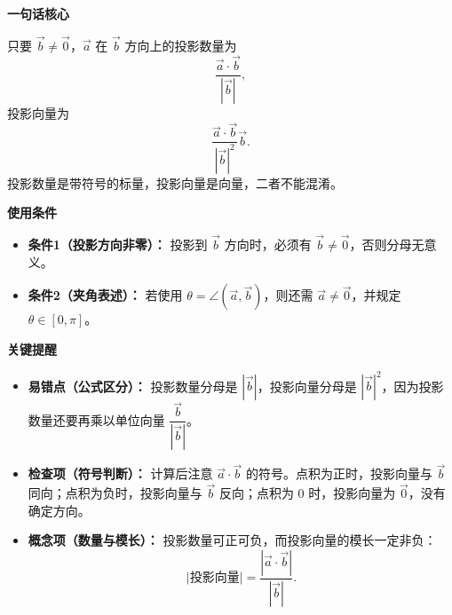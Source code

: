\begin{summarybox}
	\textbf{\textcolor{CSummary}{一句话核心}}

	只要 $\vec{b}\ne\vec{0}$，$\vec{a}$ 在 $\vec{b}$ 方向上的投影数量为
	\[
		\frac{\vec{a}\cdot\vec{b}}{|\vec{b}|},
	\]
	投影向量为
	\[
		\frac{\vec{a}\cdot\vec{b}}{|\vec{b}|^2}\vec{b}.
	\]
	投影数量是带符号的标量，投影向量是向量，二者不能混淆。

	\medskip
	\textbf{\textcolor{CSummary}{使用条件}}
	\begin{itemize}[leftmargin=*, itemsep=0.5em, topsep=0.4em]
		\item \textbf{条件1（投影方向非零）：} 投影到 $\vec{b}$ 方向时，必须有 $\vec{b}\ne\vec{0}$，否则分母无意义。
		\item \textbf{条件2（夹角表述）：} 若使用 $\theta=\angle(\vec{a},\vec{b})$，则还需 $\vec{a}\ne\vec{0}$，并规定 $\theta\in[0,\pi]$。
	\end{itemize}

	\medskip
	\textbf{\textcolor{CSummary}{关键提醒}}
	\begin{itemize}[leftmargin=*, itemsep=0.5em, topsep=0.4em]
		\item \textbf{易错点（公式区分）：} 投影数量分母是 $|\vec{b}|$，投影向量分母是 $|\vec{b}|^2$，因为投影数量还要再乘以单位向量 $\dfrac{\vec{b}}{|\vec{b}|}$。
		\item \textbf{检查项（符号判断）：} 计算后注意 $\vec{a}\cdot\vec{b}$ 的符号。点积为正时，投影向量与 $\vec{b}$ 同向；点积为负时，投影向量与 $\vec{b}$ 反向；点积为 $0$ 时，投影向量为 $\vec{0}$，没有确定方向。
		\item \textbf{概念项（数量与模长）：} 投影数量可正可负，而投影向量的模长一定非负：
		      \[
			      \bigl|\text{投影向量}\bigr|
			      =
			      \frac{|\vec{a}\cdot\vec{b}|}{|\vec{b}|}.
		      \]
	\end{itemize}
\end{summarybox}